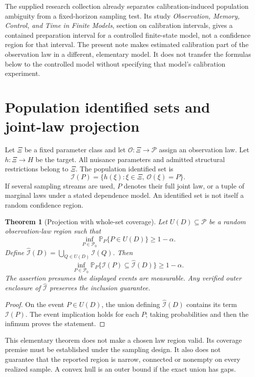 \documentclass[11pt,a4paper]{article}
\newtheorem{theorem}{Theorem}\newtheorem{proposition}[theorem]{Proposition}\newtheorem{lemma}[theorem]{Lemma}
\theoremstyle{definition}\newtheorem{definition}[theorem]{Definition}
\newcommand{\Prob}{\mathbb P}\newcommand{\E}{\mathbb E}\newcommand{\Iset}{\mathcal I}\newcommand{\Cset}{\mathcal C}
\begin{document}
The supplied research collection already separates calibration-induced population ambiguity from a fixed-horizon sampling test. Its study \emph{Observation, Memory, Control, and Time in Finite Models}, section on calibration intervals, gives a contained preparation interval for a controlled finite-state model, not a confidence region for that interval. The present note makes estimated calibration part of the observation law in a different, elementary model. It does not transfer the formulas below to the controlled model without specifying that model's calibration experiment.

\section{Population identified sets and joint-law projection}

Let $\Xi$ be a fixed parameter class and let $\mathcal O:\Xi\to\mathcal P$ assign an observation law. Let $h:\Xi\to H$ be the target. All nuisance parameters and admitted structural restrictions belong to $\Xi$. The population identified set is
\begin{equation}\label{eq:identified}
\Iset(P)=\{h(\xi):\xi\in\Xi,\ \mathcal O(\xi)=P\}.
\end{equation}
If several sampling streams are used, $P$ denotes their full joint law, or a tuple of marginal laws under a stated dependence model. An identified set is not itself a random confidence region.

\begin{theorem}[Projection with whole-set coverage]\label{thm:projection}
Let $U(D)\subseteq\mathcal P$ be a random observation-law region such that
\[
\inf_{P\in\mathcal P_0}\Prob_P\{P\in U(D)\}\ge1-\alpha.
\]
Define $\widehat{\Iset}(D)=\bigcup_{Q\in U(D)}\Iset(Q)$. Then
\[
\inf_{P\in\mathcal P_0}\Prob_P\{\Iset(P)\subseteq\widehat{\Iset}(D)\}\ge1-\alpha.
\]
The assertion presumes the displayed events are measurable. Any verified outer enclosure of $\widehat{\Iset}$ preserves the inclusion guarantee.
\end{theorem}
\begin{proof}
On the event $P\in U(D)$, the union defining $\widehat{\Iset}(D)$ contains its term $\Iset(P)$. The event implication holds for each $P$; taking probabilities and then the infimum proves the statement.
\end{proof}

This elementary theorem does not make a chosen law region valid. Its coverage premise must be established under the sampling design. It also does not guarantee that the reported region is narrow, connected or nonempty on every realized sample. A convex hull is an outer bound if the exact union has gaps.
\end{document}
